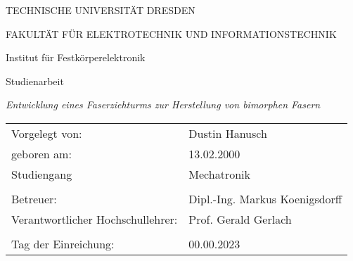 \begin{titlepage} 

\begin{center}
       \vspace*{1cm}
       \Huge
        TECHNISCHE UNIVERSITÄT DRESDEN \vspace*{1cm}
        
       FAKULTÄT FÜR ELEKTROTECHNIK UND INFORMATIONSTECHNIK \vspace{0.5cm}
       \huge
       
       Institut für Festkörperelektronik \vspace{4cm}

       \Huge
       Studienarbeit \vspace{1cm}

       \huge
       \textit{Entwicklung eines Faserziehturms zur Herstellung von bimorphen Fasern}
       \end{center}
        \vspace{5cm}

        \large
        \begin{tabular}{ll}
        
        
           Vorgelegt von:  & Dustin Hanusch \\
           
           geboren am:  &  13.02.2000\\
           Studiengang& Mechatronik\\
           \\
           Betreuer: & Dipl.-Ing. Markus Koenigsdorff\\
           Verantwortlicher Hochschullehrer: & Prof. Gerald Gerlach\\
           \\
           Tag der Einreichung:&00.00.2023\\
           \end{tabular}
        


       \vfill   
       
\end{titlepage} 